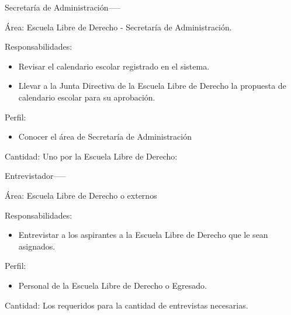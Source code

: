 \begin{actor}{Secretaría de Administración}{-----}
	
	\item[Área:] Escuela Libre de Derecho - Secretaría de Administración.
	
	\item[Responsabilidades:] \hspace{1pt}
	
	\begin{itemize}
		\item Revisar el calendario escolar registrado en el sistema.
		\item Llevar a la Junta Directiva de la Escuela Libre de Derecho la propuesta de calendario escolar para su aprobación.
	\end{itemize}
	\item[Perfil:] \hspace{1pt}
	\begin{itemize}
		\item Conocer el área de Secretaría de Administración
	\end{itemize}
	\item[Cantidad:] Uno por la Escuela Libre de Derecho:
\end{actor}


\begin{actor}{Entrevistador}{-----}
	
	\item[Área:] Escuela Libre de Derecho o externos
	
	\item[Responsabilidades:] \hspace{1pt}
	
	\begin{itemize}
		\item Entrevistar a los aspirantes a la Escuela Libre de Derecho que le sean asignados.
	\end{itemize}
	\item[Perfil:] \hspace{1pt}
	\begin{itemize}
		\item Personal de la Escuela Libre de Derecho o Egresado.
	\end{itemize}
	\item[Cantidad:] Los requeridos para la cantidad de entrevistas necesarias.
\end{actor}


